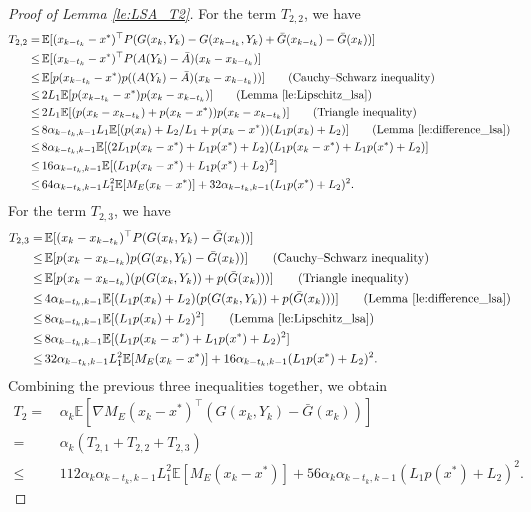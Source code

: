 \documentclass[11 pt]{article}
\begin{document}
\begin{proof}[Proof of Lemma \ref{le:LSA_T2}]
		For the term $T_{2,2}$, we have
		\begin{align*}
			T_{2,2}=\,&\mathbb{E}[(x_{k-t_k}-x^*)^\top P (G(x_k,Y_k)-G(x_{k-t_k},Y_k)+\bar{G}(x_{k-t_k})-\bar{G}(x_k))]\\
			\leq \,&\mathbb{E}[(x_{k-t_k}-x^*)^\top P (A(Y_k)-\bar{A})(x_k-x_{k-t_k})]\\
			\leq \,&\mathbb{E}[p(x_{k-t_k}-x^*) p((A(Y_k)-\bar{A})(x_k-x_{k-t_k}))]\tag{Cauchy–Schwarz inequality}\\
			\leq \,&2L_1\mathbb{E}[p(x_{k-t_k}-x^*)p(x_k-x_{k-t_k})]\tag{Lemma \ref{le:Lipschitz_lsa}}\\
			\leq \,&2L_1\mathbb{E}[(p(x_k-x_{k-t_k})+p(x_k-x^*))p(x_k-x_{k-t_k})]\tag{Triangle inequality}\\
			\leq \,&8\alpha_{k-t_k,k-1}L_1\mathbb{E}[(p(x_k)+L_2/L_1+p(x_k-x^*))(L_1p(x_k)+L_2)]\tag{Lemma \ref{le:difference_lsa}}\\
			\leq \,&8\alpha_{k-t_k,k-1}\mathbb{E}[(2L_1p(x_k-x^*)+L_1p(x^*)+L_2)(L_1p(x_k-x^*)+L_1p(x^*)+L_2)]\\
			\leq \,&16\alpha_{k-t_k,k-1}\mathbb{E}[(L_1p(x_k-x^*)+L_1p(x^*)+L_2)^2]\\
			\leq \,&64\alpha_{k-t_k,k-1}L_1^2\mathbb{E}[M_E(x_k-x^*)]+32\alpha_{k-t_k,k-1}(L_1p(x^*)+L_2)^2.
		\end{align*}
		For the term $T_{2,3}$, we have
		\begin{align*}
			T_{2,3}=\,&\mathbb{E}[(x_k-x_{k-t_k})^\top P (G(x_k,Y_k)-\bar{G}(x_k))]\\
			\leq \,&\mathbb{E}[p(x_k-x_{k-t_k})p (G(x_k,Y_k)-\bar{G}(x_k))]\tag{Cauchy–Schwarz inequality}\\
			\leq \,&\mathbb{E}[p(x_k-x_{k-t_k})(p (G(x_k,Y_k))+p(\bar{G}(x_k)))]\tag{Triangle inequality}\\
			\leq \,&4\alpha_{k-t_k,k-1}\mathbb{E}[(L_1p(x_k)+L_2)(p (G(x_k,Y_k))+p(\bar{G}(x_k)))]\tag{Lemma \ref{le:difference_lsa}}\\
			\leq \,&8\alpha_{k-t_k,k-1}\mathbb{E}[(L_1p(x_k)+L_2)^2]\tag{Lemma \ref{le:Lipschitz_lsa}}\\
			\leq \,&8\alpha_{k-t_k,k-1}\mathbb{E}[(L_1p(x_k-x^*)+L_1p(x^*)+L_2)^2]\\
			\leq \,&32\alpha_{k-t_k,k-1}L_1^2\mathbb{E}[M_E(x_k-x^*)]+16\alpha_{k-t_k,k-1}(L_1p(x^*)+L_2)^2.
		\end{align*}
		Combining the previous three inequalities together, we obtain
		\begin{align*}
			T_2=\,&\alpha_k \mathbb{E}[\nabla M_E(x_k-x^*)^\top (G(x_k,Y_k)-\bar{G}(x_k))]\\
			=\,&\alpha_k (T_{2,1}+T_{2,2}+T_{2,3})\\
			\leq \,&112\alpha_k\alpha_{k-t_k,k-1}L_1^2\mathbb{E}[M_E(x_k-x^*)]+56\alpha_k\alpha_{k-t_k,k-1}(L_1p(x^*)+L_2)^2.
		\end{align*}
	\end{proof}
	
\end{document}
